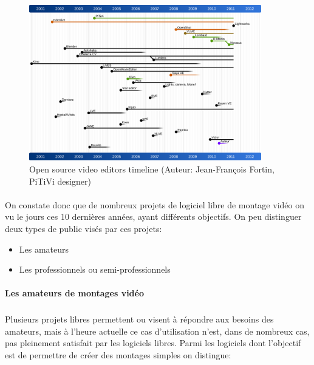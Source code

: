 \begin{figure} [h]
  \begin{center}
    \includegraphics[width=0.9\textwidth]{images/open-source-video-editor-timeline}
  \end{center} \caption{Open source video editors timeline (Auteur:
  Jean-François Fortin, PiTiVi designer)} \label{Yes}
\end{figure}

\paragraph{ }

On constate donc que de nombreux projets de logiciel libre de montage
vidéo on vu le jours ces 10 dernières années, ayant différents
objectifs.  On peu distinguer deux types de public visés par ces projets:

\begin {itemize}

  \item {Les amateurs}

  \item {Les professionnels ou semi-professionnels}
\end {itemize}

\paragraph {Les amateurs de montages vidéo}

\subparagraph{}

Plusieurs projets libres permettent ou visent à répondre aux besoins
des amateurs, mais à l'heure actuelle ce cas d'utilisation n'est, dans
de nombreux cas, pas pleinement satisfait par les logiciels libres. Parmi
les logiciels dont l'objectif est de permettre de créer des montages
simples on distingue:

